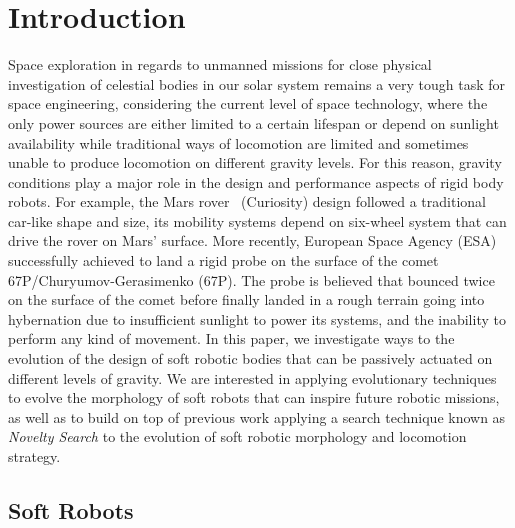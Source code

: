 \documentclass{sig-alternate}
\begin{document}


\section{Introduction}
Space exploration in regards to unmanned missions for close physical investigation of celestial bodies in our solar system remains a very tough task for space engineering, considering the current level of space technology, where the only power sources are either limited to a certain lifespan or depend on sunlight availability while traditional ways of locomotion are limited and sometimes unable to produce locomotion on different gravity levels. For this reason, gravity conditions play a major role in the design and performance aspects of rigid body robots. For example, the Mars rover~\cite{grotzinger2012mars} (Curiosity) design followed a traditional car-like shape and size, its mobility systems depend on six-wheel system that can drive the rover on Mars' surface. More recently, European Space Agency (ESA) successfully achieved to land a rigid probe on the surface of the comet 67P/Churyumov-Gerasimenko (67P). The probe is believed that bounced twice on the surface of the comet before finally landed in a rough terrain going into hybernation due to insufficient sunlight to power its systems, and the inability to perform any kind of movement. In this paper, we investigate ways to the evolution of the design of soft robotic bodies that can be passively actuated on different levels of gravity. We are interested in applying evolutionary techniques to evolve the morphology of soft robots that can inspire future robotic missions, as well as to build on top of previous work applying a search technique known as \emph{Novelty Search} to the evolution of soft robotic morphology and locomotion strategy.

\subsection{Soft Robots}
\end{document}
